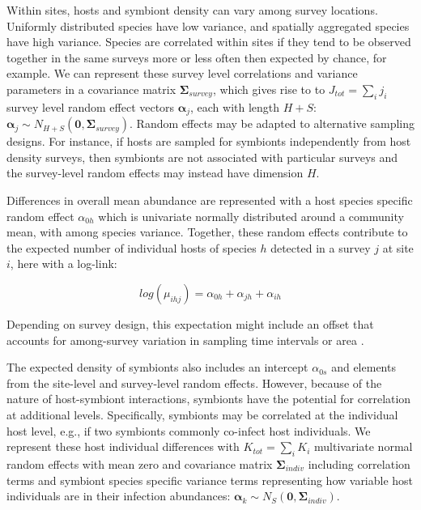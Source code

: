 Within sites, hosts and symbiont density can vary among survey locations.
Uniformly distributed species have low variance, and spatially aggregated species have high variance.
Species are correlated within sites if they tend to be observed together in the same surveys more or less often then expected by chance, for example.
We can represent these survey level correlations and variance parameters in a covariance matrix $\boldsymbol{\Sigma}_{survey}$, which gives rise to to $J_{tot} = \sum \limits_i j_i$ survey level random effect vectors $\boldsymbol{\alpha}_j$, each with length $H + S$: $\boldsymbol{\alpha}_j \sim N_{H + S}(\boldsymbol{0}, \boldsymbol{\Sigma}_{survey})$.
Random effects may be adapted to alternative sampling designs.
For instance, if hosts are sampled for symbionts independently from host density surveys, then symbionts are not associated with particular surveys and the survey-level random effects may instead have dimension $H$.

Differences in overall mean abundance are represented with a host species specific random effect $\alpha_{0h}$ which is univariate normally distributed around a community mean, with among species variance.
Together, these random effects contribute to the expected number of individual hosts of species $h$ detected in a survey $j$ at site $i$, here with a log-link:

\begin{equation*}
log(\mu_{ihj}) = \alpha_{0h} + \alpha_{jh} + \alpha_{ih}
\tag{eqn 5}
\end{equation*}

Depending on survey design, this expectation might include an offset that accounts for among-survey variation in sampling time intervals or area \citep{gelman2007data}.

The expected density of symbionts also includes an intercept $\alpha_{0s}$ and elements from the site-level and survey-level random effects.
However, because of the nature of host-symbiont interactions, symbionts have the potential for correlation at additional levels.
Specifically, symbionts may be correlated at the individual host level, e.g., if two symbionts commonly co-infect host individuals.
We represent these host individual differences with $K_{tot} = \sum_i K_i$ multivariate normal random effects with mean zero and covariance matrix $\boldsymbol{\Sigma}_{indiv}$ including correlation terms and symbiont species specific variance terms representing how variable host individuals are in their infection abundances: $\boldsymbol{\alpha}_{k} \sim N_S(\boldsymbol{0}, \boldsymbol{\Sigma}_{indiv})$.


